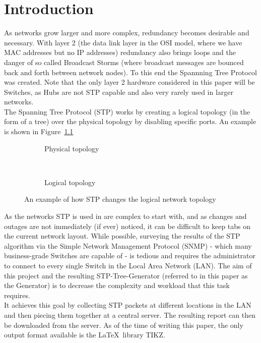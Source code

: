 \chapter{Introduction}
As networks grow larger and more complex, redundancy becomes desirable and necessary.
With layer 2 (the data link layer in the OSI model, where we have MAC addresses but no IP addresses) redundancy also brings loops and the danger of so called Broadcast Storms (where broadcast messages are bounced back and forth between network nodes).
To this end the Spannning Tree Protocol\cite{perlman85} was created.
Note that the only layer 2 hardware considered in this paper will be Switches, as Hubs are not STP capable and also very rarely used in larger networks.\\
The Spanning Tree Protocol (STP) works by creating a logical topology (in the form of a tree) over the physical topology by disabling specific ports.
An example is shown in Figure~\ref{fig:stp_example}

\begin{figure}[h]
    \begin{center}
    \begin{subfigure}[b]{0.4\textwidth}
    \caption{Physical topology}
    \end{subfigure}
    ~
    \begin{subfigure}[b]{0.4\textwidth}
    \caption{Logical topology}
    \end{subfigure}
    \end{center}
    \caption{An example of how STP changes the logical network topology}
    \label{fig:stp_example}
\end{figure}

As the networks STP is used in are complex to start with, and as changes and outages are not immediately (if ever) noticed, it can be difficult to keep tabs on the current network layout.
While possible, surveying the results of the STP algorithm via the Simple Network Management Protocol (SNMP) - which many business-grade Switches are capable of - is tedious and requires the administrator to connect to every single Switch in the Local Area Network (LAN).
The aim of this project and the resulting STP-Tree-Generator (referred to in this paper as the Generator) is to decrease the complexity and workload that this task requires.\\

It achieves this goal by collecting STP packets at different locations in the LAN and then piecing them together at a central server.
The resulting report can then be downloaded from the server.
As of the time of writing this paper, the only output format available is the \LaTeX\ library TIKZ.
